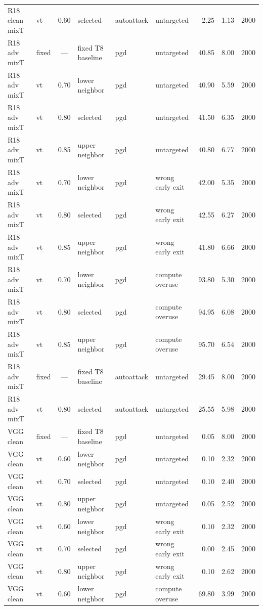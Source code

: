 {\begin{longtable}{@{}l l c l l l r r r@{}}
R18 clean mixT & vt & 0.60 & selected & autoattack & untargeted & 2.25 & 1.13 & 2000 \\
\addlinespace
R18 adv mixT & fixed & --- & fixed T8 baseline & pgd & untargeted & 40.85 & 8.00 & 2000 \\
R18 adv mixT & vt & 0.70 & lower neighbor & pgd & untargeted & 40.90 & 5.59 & 2000 \\
R18 adv mixT & vt & 0.80 & selected & pgd & untargeted & 41.50 & 6.35 & 2000 \\
R18 adv mixT & vt & 0.85 & upper neighbor & pgd & untargeted & 40.80 & 6.77 & 2000 \\
R18 adv mixT & vt & 0.70 & lower neighbor & pgd & wrong early exit & 42.00 & 5.35 & 2000 \\
R18 adv mixT & vt & 0.80 & selected & pgd & wrong early exit & 42.55 & 6.27 & 2000 \\
R18 adv mixT & vt & 0.85 & upper neighbor & pgd & wrong early exit & 41.80 & 6.66 & 2000 \\
R18 adv mixT & vt & 0.70 & lower neighbor & pgd & compute overuse & 93.80 & 5.30 & 2000 \\
R18 adv mixT & vt & 0.80 & selected & pgd & compute overuse & 94.95 & 6.08 & 2000 \\
R18 adv mixT & vt & 0.85 & upper neighbor & pgd & compute overuse & 95.70 & 6.54 & 2000 \\
R18 adv mixT & fixed & --- & fixed T8 baseline & autoattack & untargeted & 29.45 & 8.00 & 2000 \\
R18 adv mixT & vt & 0.80 & selected & autoattack & untargeted & 25.55 & 5.98 & 2000 \\
\addlinespace
VGG clean & fixed & --- & fixed T8 baseline & pgd & untargeted & 0.05 & 8.00 & 2000 \\
VGG clean & vt & 0.60 & lower neighbor & pgd & untargeted & 0.10 & 2.32 & 2000 \\
VGG clean & vt & 0.70 & selected & pgd & untargeted & 0.10 & 2.40 & 2000 \\
VGG clean & vt & 0.80 & upper neighbor & pgd & untargeted & 0.05 & 2.52 & 2000 \\
VGG clean & vt & 0.60 & lower neighbor & pgd & wrong early exit & 0.10 & 2.32 & 2000 \\
VGG clean & vt & 0.70 & selected & pgd & wrong early exit & 0.00 & 2.45 & 2000 \\
VGG clean & vt & 0.80 & upper neighbor & pgd & wrong early exit & 0.10 & 2.62 & 2000 \\
VGG clean & vt & 0.60 & lower neighbor & pgd & compute overuse & 69.80 & 3.99 & 2000 \\

\end{longtable}}

